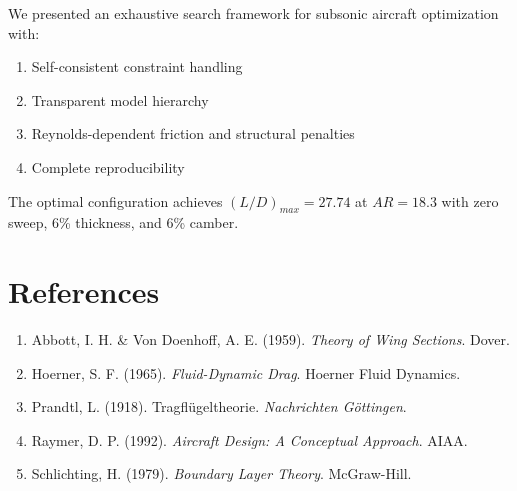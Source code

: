\documentclass[11pt,a4paper]{article}
\begin{document}
We presented an exhaustive search framework for subsonic aircraft optimization with:

\begin{enumerate}
    \item Self-consistent constraint handling
    \item Transparent model hierarchy
    \item Reynolds-dependent friction and structural penalties
    \item Complete reproducibility
\end{enumerate}

The optimal configuration achieves $(L/D)_{max} = 27.74$ at $AR = 18.3$ with zero sweep, 6\% thickness, and 6\% camber.

\section*{References}

\begin{enumerate}
\item Abbott, I. H. \& Von Doenhoff, A. E. (1959). \textit{Theory of Wing Sections}. Dover.
\item Hoerner, S. F. (1965). \textit{Fluid-Dynamic Drag}. Hoerner Fluid Dynamics.
\item Prandtl, L. (1918). Tragfl\"ugeltheorie. \textit{Nachrichten G\"ottingen}.
\item Raymer, D. P. (1992). \textit{Aircraft Design: A Conceptual Approach}. AIAA.
\item Schlichting, H. (1979). \textit{Boundary Layer Theory}. McGraw-Hill.
\end{enumerate}
\end{document}
